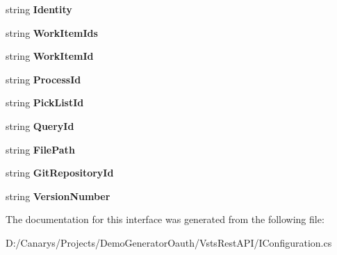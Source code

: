 \begin{DoxyCompactItemize}
string {\bfseries Identity}
\item 
\mbox{\label{interface_vsts_rest_a_p_i_1_1_i_configuration_a815952327d0b6e0b36ce010c796291ef}} 
string {\bfseries Work\+Item\+Ids}
\item 
\mbox{\label{interface_vsts_rest_a_p_i_1_1_i_configuration_af9784ef28fff8504eed017e13e73d004}} 
string {\bfseries Work\+Item\+Id}
\item 
\mbox{\label{interface_vsts_rest_a_p_i_1_1_i_configuration_ad52b4d6075b65fbe76d78e364a2eea91}} 
string {\bfseries Process\+Id}
\item 
\mbox{\label{interface_vsts_rest_a_p_i_1_1_i_configuration_a89f0800499d73104d3873334063bc3a0}} 
string {\bfseries Pick\+List\+Id}
\item 
\mbox{\label{interface_vsts_rest_a_p_i_1_1_i_configuration_aec7a1ed105d4f03c76e7b45baf12b741}} 
string {\bfseries Query\+Id}
\item 
\mbox{\label{interface_vsts_rest_a_p_i_1_1_i_configuration_aa273021f5daa05ba5d3e76043ec8e8ce}} 
string {\bfseries File\+Path}
\item 
\mbox{\label{interface_vsts_rest_a_p_i_1_1_i_configuration_a78f3ee27299039ca4c7fa8d51b998421}} 
string {\bfseries Git\+Repository\+Id}
\item 
\mbox{\label{interface_vsts_rest_a_p_i_1_1_i_configuration_a0c8e680fdd299351251205e7648a5279}} 
string {\bfseries Version\+Number}
\end{DoxyCompactItemize}


The documentation for this interface was generated from the following file\+:\begin{DoxyCompactItemize}
\item 
D\+:/\+Canarys/\+Projects/\+Demo\+Generator\+Oauth/\+Vsts\+Rest\+A\+P\+I/I\+Configuration.\+cs\end{DoxyCompactItemize}
